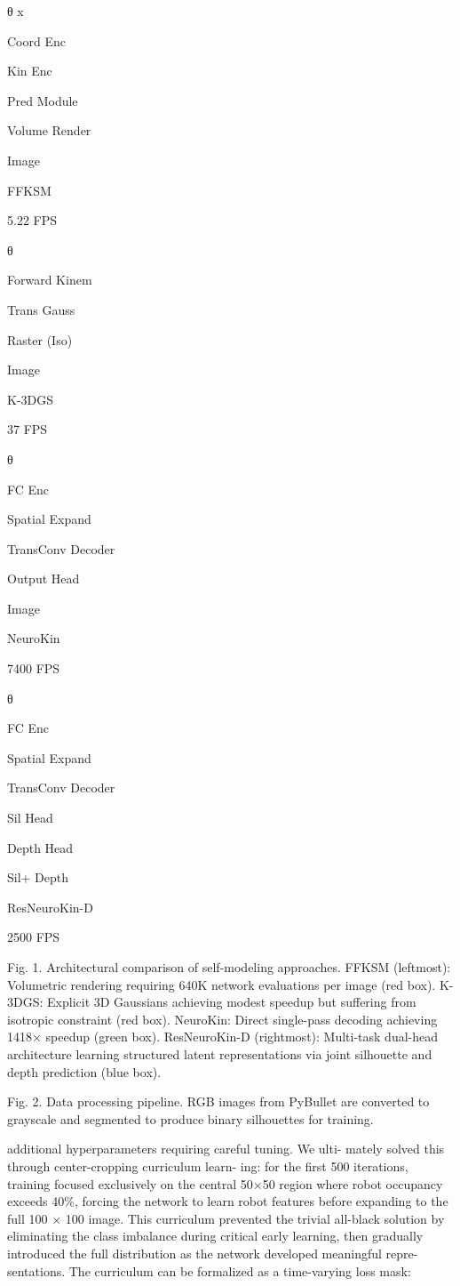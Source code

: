 \documentclass[10pt,twocolumn,letterpaper]{article}
\begin{document}
θ x

Coord Enc

Kin Enc

Pred Module

Volume Render

Image

FFKSM

5.22 FPS

θ

Forward Kinem

Trans Gauss

Raster (Iso)

Image

K-3DGS

37 FPS

θ

FC Enc

Spatial Expand

TransConv Decoder

Output Head

Image

NeuroKin

7400 FPS

θ

FC Enc

Spatial Expand

TransConv Decoder

Sil Head

Depth Head

Sil+ Depth

ResNeuroKin-D

2500 FPS

Fig. 1. Architectural comparison of self-modeling approaches. FFKSM (leftmost): Volumetric rendering requiring 640K network evaluations per image (red box). K-3DGS: Explicit 3D Gaussians achieving modest speedup but suffering from isotropic constraint (red box). NeuroKin: Direct single-pass decoding achieving 1418× speedup (green box). ResNeuroKin-D (rightmost): Multi-task dual-head architecture learning structured latent representations via joint silhouette and depth prediction (blue box).

Fig. 2. Data processing pipeline. RGB images from PyBullet are converted to grayscale and segmented to produce binary silhouettes for training.

additional hyperparameters requiring careful tuning. We ulti- mately solved this through center-cropping curriculum learn- ing: for the first 500 iterations, training focused exclusively on the central 50×50 region where robot occupancy exceeds 40\%, forcing the network to learn robot features before expanding to the full 100 × 100 image. This curriculum prevented the trivial all-black solution by eliminating the class imbalance during critical early learning, then gradually introduced the full distribution as the network developed meaningful repre- sentations. The curriculum can be formalized as a time-varying loss mask:
\end{document}

